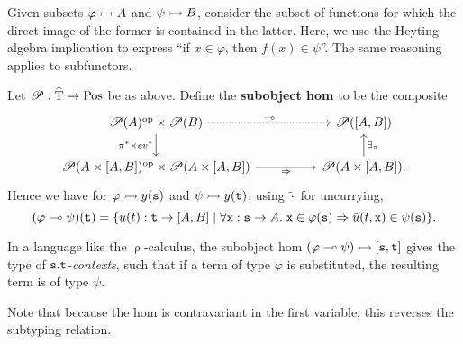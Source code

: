 \documentclass[stthol.tex]{subfiles}
\begin{document}
Given subsets $\varphi\rightarrowtail A$ and $\psi\rightarrowtail B$, consider the subset of functions for which the direct image of the former is contained in the latter. Here, we use the Heyting algebra implication to express ``if $x\in \varphi$, then $f(x)\in \psi$''. The same reasoning applies to subfunctors.

\begin{definition}
  Let $\mathscr{P}:\widehat{\mathrm{T}}\to \mathrm{Pos}$ be as above. Define the \textbf{subobject hom} to be the composite
\[\begin{tikzcd}
    \pow(A)^\op\times \pow(B) \arrow[rr, "\multimap",dotted] \arrow[d, "\pi^*\times ev^*",swap] && \pow([A,B])\\
    \pow(A\times [A,B])^\op\times \pow(A\times [A,B]) \arrow[rr,"\Rightarrow", swap] && \pow(A\times [A,B]). \arrow[u,"\exists_\pi", swap]
  \end{tikzcd}\]
Hence we have for $\varphi\rightarrowtail y(\mathtt{s})$ and $\psi\rightarrowtail y(\mathtt{t})$, using $\tilde{\cdot}$ for uncurrying,
$$(\varphi\multimap \psi)(\ttt) = \{u(t):\ttt\to [A,B]\; |\; %
  \forall \ttx:\tts\to A.\; \ttx\in \varphi(\tts)\Rightarrow \tilde{u}(t,\ttx)\in \psi(\tts)\}.$$
\end{definition}

In a language like the $\uprho$-calculus, the subobject hom $(\varphi\multimap \psi) \rightarrowtail [\mathtt{s},\mathtt{t}]$ gives the type of $\mathtt{s}.\mathtt{t}$-\textit{contexts}, such that if a term of type $\varphi$ is substituted, the resulting term is of type $\psi$.

Note that because the hom is contravariant in the first variable, this reverses the subtyping relation.

\end{document}
